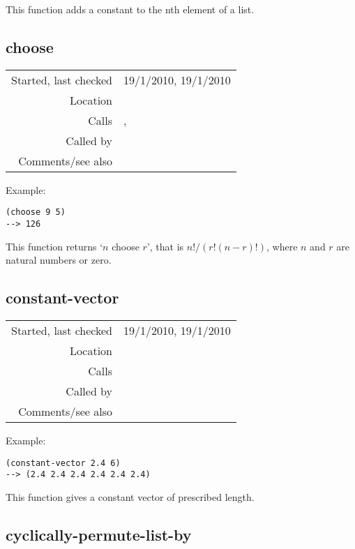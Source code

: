 \noindent This function adds a constant to the nth
element of a list.


\subsection*{choose}\label{fun:choose}

\vspace{0.3cm}
\begin{tabular}{r|p{8cm}}
Started, last checked & 19/1/2010, 19/1/2010 \\
Location & \nameref{sec:list-processing} \\
Calls & \nameref{fun:factorial}, \nameref{fun:factorial-j} \\
Called by & \\
Comments/see also & 
\end{tabular}

\vspace{0.5cm}
\noindent Example:
\begin{verbatim}
(choose 9 5)
--> 126
\end{verbatim}

\noindent This function returns `$n$ choose $r$', that
is $n!/(r!(n-r)!)$, where $n$ and $r$ are natural
numbers or zero.


\subsection*{constant-vector}\label{fun:constant-vector}

\vspace{0.3cm}
\begin{tabular}{r|p{8cm}}
Started, last checked & 19/1/2010, 19/1/2010 \\
Location & \nameref{sec:list-processing} \\
Calls & \\
Called by & \\
Comments/see also & 
\end{tabular}

\vspace{0.5cm}
\noindent Example:
\begin{verbatim}
(constant-vector 2.4 6)
--> (2.4 2.4 2.4 2.4 2.4 2.4)
\end{verbatim}

\noindent This function gives a constant vector of
prescribed length.


\subsection*{cyclically-permute-list-by}\label{fun:cyclically-permute-list-by}

